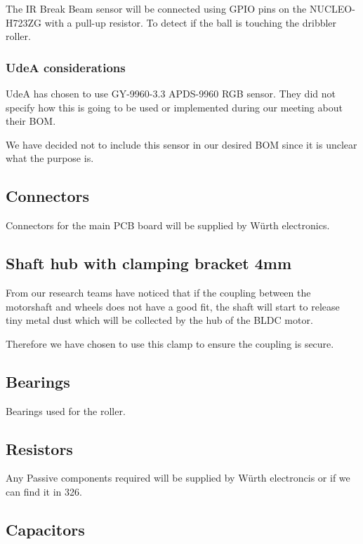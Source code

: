 \documentclass[a4paper,8pt]{article}
\begin{document}
  The IR Break Beam sensor will be connected using GPIO pins on the
  NUCLEO-H723ZG with a pull-up resistor. To detect if the ball is touching the dribbler roller.

  \subsubsection{UdeA considerations}

  UdeA has chosen to use GY-9960-3.3 APDS-9960 RGB sensor. They did not specify how this is going to be used or implemented during our meeting about their BOM.

  We have decided not to include this sensor in our desired BOM since it is unclear what the purpose is.

  \subsection{Connectors}

  Connectors for the main PCB board will be supplied by Würth
  electronics.

  \subsection{Shaft hub with clamping bracket 4mm}

  From our research teams have noticed that if the coupling between the
  motorshaft and wheels does not have a good fit, the shaft will start
  to release tiny metal dust which will be collected by the hub of the
  BLDC motor.

  Therefore we have chosen to use this clamp to ensure the coupling is
  secure.

  \subsection{Bearings}

  Bearings used for the roller.

  \subsection{Resistors}

  Any Passive components required will be supplied by Würth electroncis
  or if we can find it in 326.

  \subsection{Capacitors}
\end{document}
